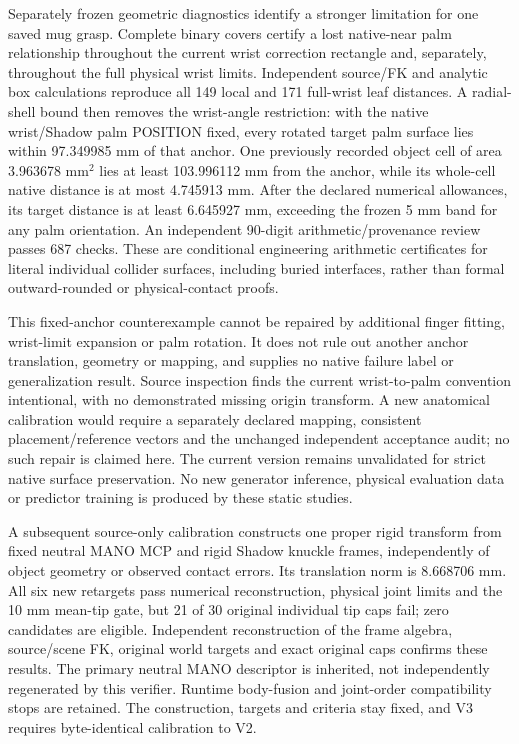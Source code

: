 \documentclass[10pt,letterpaper]{article}
\begin{document}
Separately frozen geometric diagnostics identify a stronger limitation for
one saved mug grasp. Complete binary covers certify a lost native-near palm
relationship throughout the current wrist correction rectangle and, separately,
throughout the full physical wrist limits. Independent source/FK and analytic
box calculations reproduce all 149 local and 171 full-wrist leaf distances.
A radial-shell bound then removes the wrist-angle restriction: with the native
wrist/Shadow palm POSITION fixed, every rotated target palm surface lies within
97.349985 mm of that anchor. One previously recorded object cell of area
3.963678 mm$^2$ lies at least 103.996112 mm from the anchor, while its whole-cell
native distance is at most 4.745913 mm. After the declared numerical allowances,
its target distance is at least 6.645927 mm, exceeding the frozen 5 mm band
for any palm orientation. An independent 90-digit arithmetic/provenance review
passes 687 checks. These are conditional engineering arithmetic certificates
for literal individual collider surfaces, including buried interfaces, rather
than formal outward-rounded or physical-contact proofs.

This fixed-anchor counterexample cannot be repaired by additional finger
fitting, wrist-limit expansion or palm rotation. It does not rule out another
anchor translation, geometry or mapping, and supplies no native failure label
or generalization result. Source inspection finds the current wrist-to-palm
convention intentional, with no demonstrated missing origin transform. A new
anatomical calibration would require a separately declared mapping, consistent
placement/reference vectors and the unchanged independent acceptance audit;
no such repair is claimed here. The current version remains unvalidated for
strict native surface preservation. No new generator inference, physical
evaluation data or predictor training is produced by these static studies.

A subsequent source-only calibration constructs one proper rigid transform
from fixed neutral MANO MCP and rigid Shadow knuckle frames, independently
of object geometry or observed contact errors. Its translation norm is
8.668706 mm. All six new retargets pass numerical reconstruction, physical
joint limits and the 10 mm mean-tip gate, but 21 of 30 original individual
tip caps fail; zero candidates are eligible. Independent reconstruction of
the frame algebra, source/scene FK, original world targets and exact original
caps confirms these results. The primary neutral MANO descriptor is inherited,
not independently regenerated by this verifier. Runtime body-fusion and
joint-order compatibility stops are retained. The construction, targets and
criteria stay fixed, and V3 requires byte-identical calibration to V2.
\end{document}
